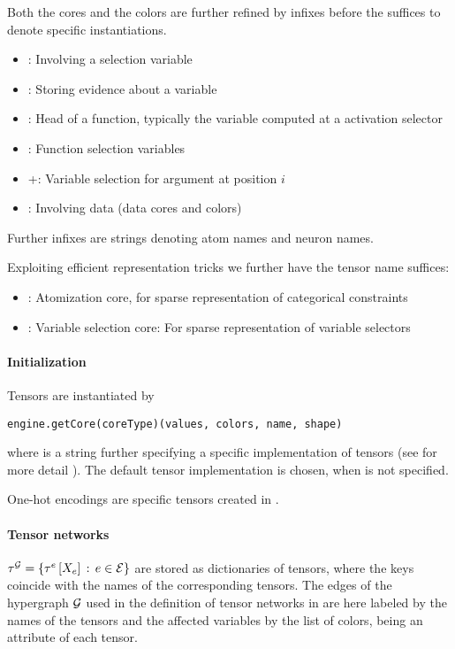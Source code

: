 Both the cores and the colors are further refined by infixes before the suffices to denote specific instantiations.

\begin{itemize}
    \item \selCoreIn: Involving a selection variable
    \item \eviCoreIn: Storing evidence about a variable
    \item \heaIn: Head of a function, typically the variable computed at a activation selector
    \item \funIn: Function selection variables
    \item \posIn+: Variable selection for argument at position $i$
    \item \datIn: Involving data (data cores and colors)
\end{itemize}

Further infixes are strings denoting atom names and neuron names.

Exploiting efficient representation tricks we further have the tensor name suffices:
\begin{itemize}
    \item \atoCoreSuf: Atomization core, for sparse representation of categorical constraints
    \item \vselCoreSuf: Variable selection core: For sparse representation of variable selectors
\end{itemize}

\paragraph{Initialization}
Tensors are instantiated by
\begin{lstlisting}
engine.getCore(coreType)(values, colors, name, shape)
\end{lstlisting}
where  is a string further specifying a specific implementation of tensors (see for more detail ).
The default tensor implementation  is chosen, when  is not specified.


One-hot encodings are specific tensors created in \sprepresentation{}.

\subsect{\bncontractions}

\paragraph{Tensor networks} $\tau^{\mathcal{G}}=\{\tau^{e}\left[X_{e}\right]\,:\,e\in\mathcal{E}\}$ are stored as dictionaries of tensors, where the keys coincide with the names of the corresponding tensors.
The edges of the hypergraph $\mathcal{G}$ used in the definition of tensor networks in  are here labeled by the names of the tensors and the affected variables by the list of colors, being an attribute of each tensor.

